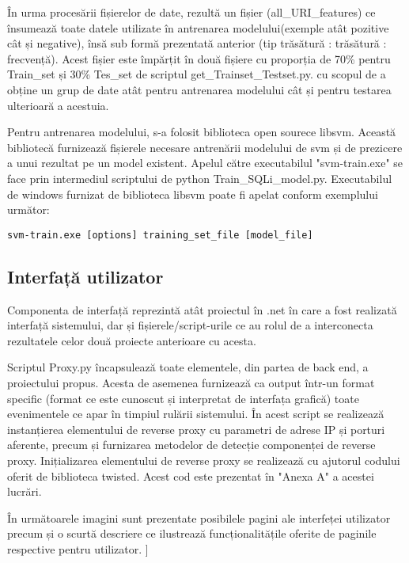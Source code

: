 În urma procesării fișierelor de date, rezultă un fișier  (all\_URI\_features)  ce însumează toate datele utilizate în antrenarea modelului(exemple atât pozitive cât și negative), însă sub formă prezentată anterior (tip trăsătură :  trăsătură : frecvență). Acest fișier este împărțit în două fișiere cu proporția  de 70\% pentru Train\_set și 30\% Tes\_set de scriptul get\_Trainset\_Testset.py.  cu scopul de a obține un grup de date atât pentru antrenarea modelului cât și pentru testarea ulterioară a acestuia. 

Pentru antrenarea modelului, s-a folosit biblioteca open sourece libsvm. Această bibliotecă furnizează fișierele necesare antrenării modelului de svm și de prezicere a unui rezultat pe un model existent. Apelul către executabilul "svm-train.exe" se face prin intermediul scriptului de python  Train\_SQLi\_model.py.
Executabilul de windows furnizat de biblioteca libsvm poate fi apelat conform exemplului următor: 

\begin{lstlisting} 
svm-train.exe [options] training_set_file [model_file]
\end{lstlisting}

\subsection{Interfață utilizator}

 Componenta de interfață reprezintă atât proiectul în .net în care a fost realizată interfață sistemului, dar și fișierele/script-urile ce au rolul de a interconecta rezultatele celor două proiecte anterioare cu acesta. 

Scriptul Proxy.py încapsulează toate elementele, din partea de back end, a proiectului propus. Acesta de asemenea furnizează ca output într-un format specific (format ce este cunoscut și interpretat de interfața grafică) toate evenimentele ce apar în timpiul rulării sistemului. În acest script se realizează instanțierea elementului de reverse proxy cu parametri de adrese IP și porturi aferente, precum și furnizarea metodelor de detecție componenței de reverse proxy. Inițializarea elementului de reverse proxy se realizează cu ajutorul codului oferit de biblioteca twisted. Acest cod este prezentat în "Anexa A" a acestei lucrări. 

În următoarele imagini sunt prezentate posibilele pagini ale interfeței utilizator precum și o scurtă descriere ce ilustrează funcționalitățile oferite de paginile respective pentru utilizator. 
\newpage]
 
